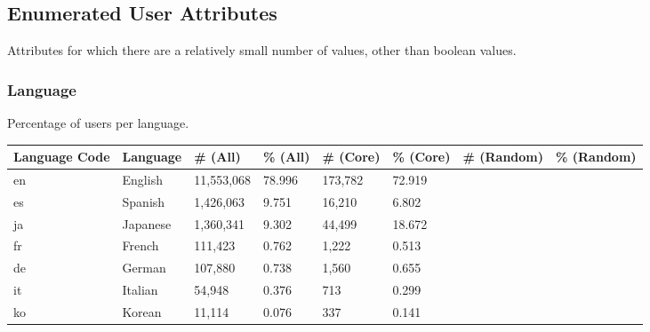 \subsection{Enumerated User Attributes}
Attributes for which there are a relatively small number of values, other than boolean values.
\subsubsection{Language}
Percentage of users per language.\\

\begin{tabular}{| l | l | l | l | l | l | l | l |}
\hline
\textbf{Language Code} & \textbf{Language} & \textbf{\# (All)}  & \textbf{\% (All)} & \textbf{\# (Core)}  & \textbf{\% (Core)} & \textbf{\# (Random)} & \textbf{\% (Random)} \\ \hline
en & English & 11,553,068 & 78.996 & 173,782 & 72.919 & & \\ \hline
es & Spanish & 1,426,063 & 9.751 & 16,210 & 6.802 & & \\ \hline
ja & Japanese & 1,360,341 & 9.302 & 44,499 & 18.672 & & \\ \hline
fr & French & 111,423 & 0.762 & 1,222 & 0.513 & & \\ \hline
de & German & 107,880 & 0.738 & 1,560 & 0.655 & & \\ \hline
it & Italian & 54,948 & 0.376 & 713 & 0.299 & & \\ \hline
ko & Korean & 11,114 & 0.076 & 337 & 0.141 & & \\ \hline
\end{tabular}

